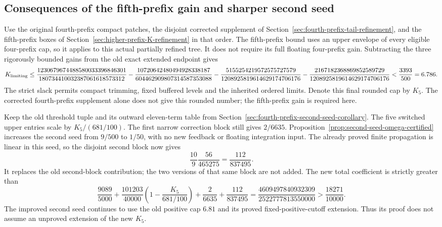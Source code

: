 \documentclass[11pt]{article}
\begin{document}
\subsection{Consequences of the fifth-prefix gain and sharper second seed}
\label{sec:fifth-prefix-omega-corollary}

Use the original fourth-prefix compact patches, the disjoint
corrected supplement of Section~\ref{sec:fourth-prefix-tail-refinement},
and the fifth-prefix boxes of
Section~\ref{sec:higher-prefix-K-refinement} in that order.
The fifth-prefix bound uses an upper envelope of every eligible
four-prefix cap, so it applies to this actual partially refined
tree. It does not require its full floating four-prefix gain.
Subtracting the three rigorously bounded gains from the old exact
extended endpoint gives
\[
 K_{\rm limiting}\le
 \frac{1230679674488580033396846301}{180734410032387061618573312}
 -\frac{10720642480494928338187}{604462909807314587353088}
 -\frac{5155254219572575727579}{1208925819614629174706176}
 -\frac{2167182368869852589729}{1208925819614629174706176}
 <\frac{3393}{500}=6.786.
\]
The strict slack permits compact trimming, fixed buffered levels
and the inherited ordered limits. Denote this final rounded cap
by $K_5$. The corrected fourth-prefix supplement alone does not
give this rounded number; the fifth-prefix gain is required here.

Keep the old threshold tuple and its outward eleven-term table
from Section~\ref{sec:fourth-prefix-second-seed-corollary}.
The five switched upper entries scale by $K_5/(681/100)$.
The first narrow correction block still gives $2/6635$.
Proposition~\ref{prop:second-seed-omega-certified} increases the
second seed from $9/500$ to $1/50$, with no new feedback or
floating integration input. The already proved finite propagation
is linear in this seed, so the disjoint second block now gives
\[
 \frac{10}{9}\frac{56}{465275}=\frac{112}{837495}.
\]
It replaces the old second-block contribution; the two versions
of that same block are not added. The new total coefficient is
strictly greater than
\begin{equation}\label{eq:fifth-prefix-omega-c}
 \frac{9089}{5000}
 +\frac{101203}{40000}\left(1-\frac{K_5}{681/100}\right)
 +\frac2{6635}+\frac{112}{837495}
 =\frac{4609497840932309}{2522777813550000}
 >\frac{18271}{10000}.
\end{equation}
The improved second seed continues to use the old positive cap
$6.81$ and its proved fixed-positive-cutoff extension. Thus its
proof does not assume an unproved extension of the new $K_5$.
\end{document}

